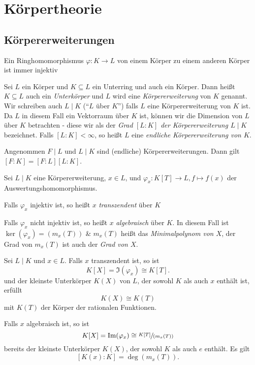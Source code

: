 \graphicspath{{Images/}}

\chapter{Körpertheorie}

\section{Körpererweiterungen}
\begin{remark}
	Ein Ringhomomorphismus $\varphi: K \to L$ von einem Körper zu einem anderen Körper ist immer injektiv 
\end{remark}

\begin{definition}
	Sei $L$ ein Körper und $K \subseteq L$ ein Unterring und auch ein Körper.
	Dann heißt $K \subseteq L$ auch ein \emph{Unterkörper} und $L$ wird eine \emph{Körpererweiterung} von  $K$ genannt.
	Wir schreiben auch $L \mid K$ (\enquote{$L$ über $K$}) falls $L$ eine Körpererweiterung von $K$ ist.
	Da $L$ in diesem Fall ein Vektorraum über $K$ ist, können wir die Dimension von $L$ über $K$ betrachten -
	diese wir als der \emph{Grad $[L:K]$ der Körpererweiterung  $L \mid K$} bezeichnet.
	Falls $[L:K] < \infty$, so heißt $L$ eine \emph{endliche Körpererweiterung von $K$}.
\end{definition}


\begin{theorem}
	Angenommen $F \mid L $ und $L \mid K$ sind (endliche) Körpererweiterungen.
	Dann gilt $[F:K] = [F:L] [L:K]$.
\end{theorem}


\begin{definition}
	Sei $L \mid K$ eine Körpererweiterung, $x \in L$, und $\varphi_{x}: K[T] \to L, f \mapsto f(x)$ der Auswertungshomomorphismus.

	Falls $\varphi_{x}$ injektiv ist, so heißt $x$ \emph{transzendent} über $K$ 

	Falls $\varphi_{x}$ nicht injektiv ist, so heißt $x$ \emph{algebraisch} über $K$.
	In diesem Fall ist $\ker(\varphi_{x}) = (m_{x}(T))$ \& $m_{x}(T)$ heißt das
	\emph{Minimalpolynom von $X$}, der Grad von $m_{x}(T)$ ist auch der \emph{Grad von $X$}.
\end{definition}


\begin{proposition}
	Sei $L \mid K$ und $x \in L$. Falls $x$ transzendent ist, so ist 
	\[
		K[X] = \Im(\varphi_{x}) \cong K[T]
	.\] 
	und der kleinste Unterkörper $K(X)$ von $L$, der sowohl $K$ als auch $x$ enthält ist, erfüllt
	\[
		K(X) \cong K(T)
	\] 
	mit  $K(T)$ der Körper der rationalen Funktionen.

	Falls $x$ algebraisch ist, so ist
	\[
		K[X] = \Im(\varphi_{x}) \cong \sfrac{K[T]}{(m_{x}(T))}
	\] 
	bereits der kleinste Unterkörper $K(X)$, der sowohl $K$ als auch $e$ enthält.
	Es gilt
	\[
		[K(x):K] = \deg(m_x(T))
	.\] 
\end{proposition}


